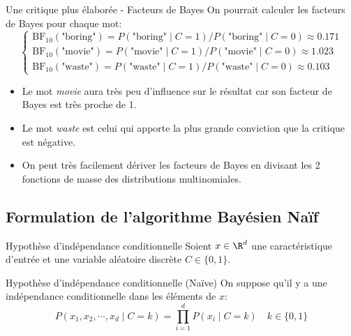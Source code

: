 \begin{frame}{Une critique plus élaborée - Facteurs de Bayes}
	On pourrait calculer les facteurs de Bayes pour chaque mot:
	\begin{equation}
		\begin{cases}
			\text{BF}_{10}(\text{"boring"}) = P(\text{"boring"} \mid C = 1) / P(\text{"boring"} \mid C = 0) \approx 0.171 \\
			\text{BF}_{10}(\text{"movie"}) = P(\text{"movie"} \mid C = 1) / P(\text{"movie"} \mid C = 0) \approx 1.023 \\
			\text{BF}_{10}(\text{"waste"}) = P(\text{"waste"} \mid C = 1) / P(\text{"waste"} \mid C = 0) \approx 0.103
		\end{cases}
		\nonumber
	\end{equation}
	\pause
	\begin{itemize}
		\item Le mot \textit{movie} aura très peu d'influence sur le résultat car son facteur de Bayes est très proche de 1.
		\item Le mot \textit{waste} est celui qui apporte la plus grande conviction que la critique est négative.
		\item On peut très facilement dériver les facteurs de Bayes en divisant les 2 fonctions de masse des distributions multinomiales.
	\end{itemize}
\end{frame}

\subsection[Formulation de l'algorithme Bayésien Naïf]{Formulation de l'algorithme Bayésien Naïf}

\begin{frame}{Hypothèse d'indépendance conditionnelle}
	Soient $x \in \R^d$ une caractéristique d'entrée et une variable aléatoire discrète $C \in \{0, 1\}$.
	\vspace{0.3cm}
	\begin{block}{Hypothèse d'indépendance conditionnelle (Naïve)}
		On suppose qu'il y a une indépendance conditionnelle dans les éléments de $x$:
		\begin{equation}
			P(x_1, x_2, \cdots, x_d \mid C = k) = \prod_{i=1}^{d} P(x_i \mid C = k) \quad k \in \{0, 1\}
			\nonumber
		\end{equation}
	\end{block}
\end{frame}

